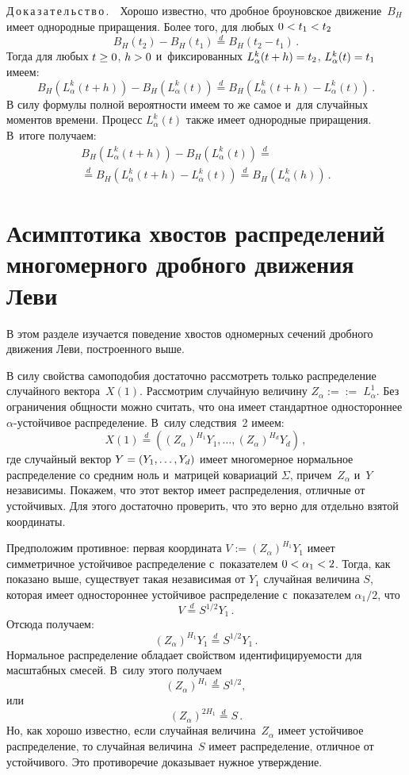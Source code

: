 \begin{multicols}{2}
\smallskip

\noindent
Д\,о\,к\,а\,з\,а\,т\,е\,л\,ь\,с\,т\,в\,о\,.\ \ 
Хорошо известно, что дробное броуновское движение~$B_H$ имеет однородные приращения. 
Более того, для любых $0\hm < t_1 \hm< t_2 $
$$
B_H \left(t_2 \right) - B_H \left(t_1 \right) \stackrel{d}{=} B_H \left(t_2 - t_1 \right)\,. 
$$
Тогда для любых $t\hm\geq 0$, $h\hm>0$ и~фиксированных $L_{\alpha}^k (t+h) \hm= 
t_2$, $L_{\alpha}^k (t) \hm= t_1$ имеем:
$$
B_H (L_{\alpha}^k (t+h)) - B_H (L_{\alpha}^k (t)) \stackrel{d}{=}
B_H (L_{\alpha}^k (t+h) -  L_{\alpha}^k (t))\,.
$$
В силу формулы полной вероятности имеем то же самое и~для случайных моментов времени.
Процесс $L_{\alpha}^k (t)$ также имеет однородные приращения. В~итоге получаем:
\begin{multline*}
B_H \left(L_{\alpha}^k (t+h)\right) - B_H \left(L_{\alpha}^k (t)\right) \stackrel{d}{=}{}\\
{}\stackrel{d}{=}
B_H \left(L_{\alpha}^k (t+h) -  L_{\alpha}^k (t)\right)
\stackrel{d}{=}
B_H \left(L_{\alpha}^k (h) \right)  \,.
\end{multline*}


\section{Асимптотика хвостов распределений многомерного дробного движения Леви}

В этом разделе изучается поведение хвостов одномерных сечений 
дробного движения Леви, построенного выше.


В силу свойства самоподобия достаточно рассмотреть только распределение 
случайного вектора~$X(1)$. Рассмотрим случайную величину
$Z_{\alpha} :=$\linebreak $:=\;L_{\alpha}^1$. Без ограничения общности можно считать, 
что она имеет стандартное одностороннее
$\alpha$-устой\-чи\-вое распределение. В~силу следствия~2 имеем:
$$
X(1) \stackrel{d}{=} ((Z_{\alpha})^{H_1}  Y_1 , \ldots , (Z_{\alpha})^{H_d}  Y_d ) \, ,
$$
где случайный вектор $Y \hm= (Y_1 , \ldots , Y_d )$ имеет многомерное нормальное распределение со средним ноль и~матрицей ковариаций $\Sigma$,
причем~$Z_{\alpha}$ и~$Y$ независимы.
Покажем, что этот вектор имеет распределения, отличные от устойчивых. Для этого достаточно проверить, что это верно для
отдельно взятой координаты.

Предположим противное: первая координата $V:= (Z_{\alpha} )^{H_1} Y_1$ имеет симметричное устойчивое распределение
с~показателем $0\hm<\alpha_1 \hm<2$. Тогда, как показано выше, существует такая независимая от $Y_1$ случайная величина $S$, которая
имеет одностороннее устойчивое распределение с~показателем $\alpha_1/2$, что
$$
V \stackrel{d}{=} S^{1/2} Y_1 \, .
$$
Отсюда получаем:
$$
(Z_{\alpha} )^{H_1} Y_1 \stackrel{d}{=} S^{1/2} Y_1\,  .
$$
Нормальное распределение обладает свойством идентифицируемости для масштабных смесей. 
В~силу этого получаем
$$
(Z_{\alpha} )^{H_1} \stackrel{d}{=} S^{1/2},
$$
или
$$
(Z_{\alpha} )^{2 H_1} \stackrel{d}{=} S  \,.
$$
Но, как хорошо известно, если случайная величина~$Z_{\alpha}$ имеет устойчивое распределение, то случайная 
величина~$S$ имеет распределение, отличное от устойчивого. Это противоречие 
доказывает нужное утверждение.


\end{multicols}
